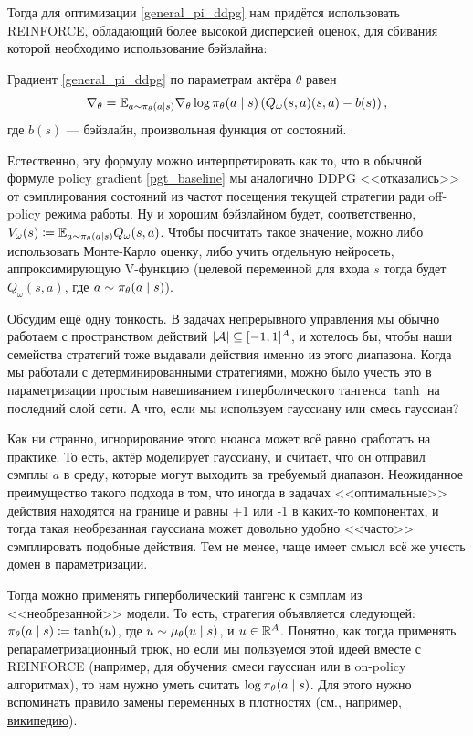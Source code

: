 Тогда для оптимизации \eqref{general_pi_ddpg} нам придётся использовать REINFORCE, обладающий более высокой дисперсией оценок, для сбивания которой необходимо использование бэйзлайна:

\begin{proposition}
Градиент \eqref{general_pi_ddpg} по параметрам актёра $\theta$ равен
$$\nabla_\theta = \mathbb{E}_{a \sim \pi_\theta(a \mid s)} \nabla_{\theta} \log \pi_\theta(a \mid s) \left( Q_\omega(s, a)(s, a) - b(s) \right),$$
где $b(s)$ --- бэйзлайн, произвольная функция от состояний.
\end{proposition}

Естественно, эту формулу можно интерпретировать как то, что в обычной формуле policy gradient \eqref{pgt_baseline} мы аналогично DDPG <<отказались>> от сэмплирования состояний из частот посещения текущей стратегии ради off-policy режима работы. Ну и хорошим бэйзлайном будет, соответственно, $V_\omega(s) \coloneqq \mathbb{E}_{a \sim \pi_\theta(a \mid s)} Q_\omega(s, a)$. Чтобы посчитать такое значение, можно либо использовать Монте-Карло оценку, либо учить отдельную нейросеть, аппроксимирующую V-функцию (целевой переменной для входа $s$ тогда будет $Q_\omega(s, a)$, где $a \HM\sim \pi_\theta(a \HM\mid s)$).

Обсудим ещё одну тонкость. В задачах непрерывного управления мы обычно работаем с пространством действий $|\mathcal{A}| \subseteq [-1, 1]^A$, и хотелось бы, чтобы наши семейства стратегий тоже выдавали действия именно из этого диапазона. Когда мы работали с детерминированными стратегиями, можно было учесть это в параметризации простым навешиванием гиперболического тангенса $\tanh$ на последний слой сети. А что, если мы используем гауссиану или смесь гауссиан?

\begin{remark}
Как ни странно, игнорирование этого нюанса может всё равно сработать на практике. То есть, актёр моделирует гауссиану, и считает, что он отправил сэмплы $a$ в среду, которые могут выходить за требуемый диапазон. Неожиданное преимущество такого подхода в том, что иногда в задачах <<оптимальные>> действия находятся на границе и равны +1 или -1 в каких-то компонентах, и тогда такая необрезанная гауссиана может довольно удобно <<часто>> сэмплировать подобные действия. Тем не менее, чаще имеет смысл всё же учесть домен в параметризации. 
\end{remark}

Тогда можно применять гиперболический тангенс к сэмплам из <<необрезанной>> модели. То есть, стратегия объявляется следующей: $\pi_\theta(a \HM \mid s) \coloneqq \tanh(u)$, где $u \HM \sim \mu_\theta(u \HM \mid s)$, и $u \HM \in \R^A$. Понятно, как тогда применять репараметризационный трюк, но если мы пользуемся этой идеей вместе с REINFORCE (например, для обучения смеси гауссиан или в on-policy алгоритмах), то нам нужно уметь считать $\log \pi_\theta(a \HM \mid s)$. Для этого нужно вспоминать правило замены переменных в плотностях (см., например, \href{https://ru.wikipedia.org/wiki/Плотность_вероятности#Плотность_преобразования_случайной_величины}{википедию}).

